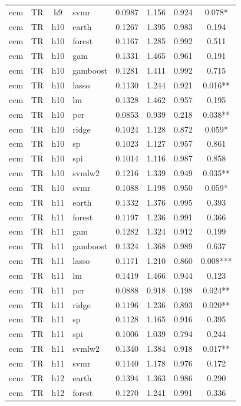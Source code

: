 \begin{ThreePartTable}
\begin{longtable}[t]{llclcccc}
ecm & TR & h9 & svmr & 0.0987 & 1.156 & 0.924 & 0.078*\\
\addlinespace
ecm & TR & h10 & earth & 0.1267 & 1.395 & 0.983 & 0.194\\
ecm & TR & h10 & forest & 0.1167 & 1.285 & 0.992 & 0.511\\
ecm & TR & h10 & gam & 0.1331 & 1.465 & 0.961 & 0.191\\
ecm & TR & h10 & gamboost & 0.1281 & 1.411 & 0.992 & 0.715\\
ecm & TR & h10 & lasso & 0.1130 & 1.244 & 0.921 & 0.016**\\
ecm & TR & h10 & lm & 0.1328 & 1.462 & 0.957 & 0.195\\
ecm & TR & h10 & pcr & 0.0853 & 0.939 & 0.218 & 0.038**\\
ecm & TR & h10 & ridge & 0.1024 & 1.128 & 0.872 & 0.059*\\
ecm & TR & h10 & sp & 0.1023 & 1.127 & 0.957 & 0.861\\
ecm & TR & h10 & spi & 0.1014 & 1.116 & 0.987 & 0.858\\
ecm & TR & h10 & svmlw2 & 0.1216 & 1.339 & 0.949 & 0.035**\\
ecm & TR & h10 & svmr & 0.1088 & 1.198 & 0.950 & 0.059*\\
\addlinespace
ecm & TR & h11 & earth & 0.1332 & 1.376 & 0.995 & 0.393\\
ecm & TR & h11 & forest & 0.1197 & 1.236 & 0.991 & 0.366\\
ecm & TR & h11 & gam & 0.1282 & 1.324 & 0.912 & 0.199\\
ecm & TR & h11 & gamboost & 0.1324 & 1.368 & 0.989 & 0.637\\
ecm & TR & h11 & lasso & 0.1171 & 1.210 & 0.860 & 0.008***\\
ecm & TR & h11 & lm & 0.1419 & 1.466 & 0.944 & 0.123\\
ecm & TR & h11 & pcr & 0.0888 & 0.918 & 0.198 & 0.024**\\
ecm & TR & h11 & ridge & 0.1196 & 1.236 & 0.893 & 0.020**\\
ecm & TR & h11 & sp & 0.1128 & 1.165 & 0.916 & 0.395\\
ecm & TR & h11 & spi & 0.1006 & 1.039 & 0.794 & 0.244\\
ecm & TR & h11 & svmlw2 & 0.1340 & 1.384 & 0.918 & 0.017**\\
ecm & TR & h11 & svmr & 0.1140 & 1.178 & 0.976 & 0.172\\
\addlinespace
ecm & TR & h12 & earth & 0.1394 & 1.363 & 0.986 & 0.290\\
ecm & TR & h12 & forest & 0.1270 & 1.241 & 0.991 & 0.336\\

\end{longtable}
\end{ThreePartTable}
